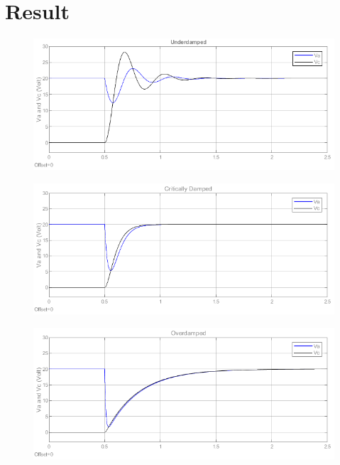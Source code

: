\documentclass{article}
\begin{document}
\newpage
\section*{Result}
\begin{figure}[H]
    \centering
        \includegraphics[scale=0.65]{2_UD.png}
\end{figure}
\begin{figure}[H]
    \centering
        \includegraphics[scale=0.65]{2_CD.png}
\end{figure}
\begin{figure}[H]
    \centering
        \includegraphics[scale=0.65]{2_OD.png}
\end{figure}
\end{document}
